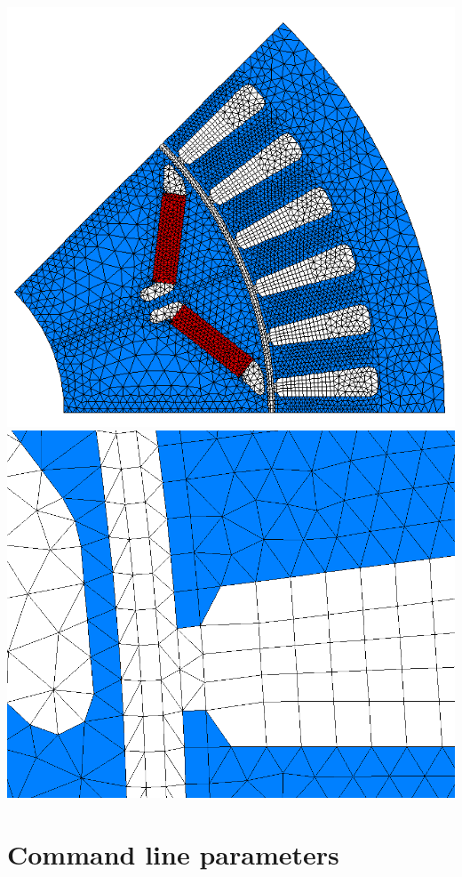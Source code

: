 \documentclass[10pt, a4paper,german]{scrartcl}
\begin{document}
\includegraphics[width=0.45\linewidth]{mesh}\hfill\includegraphics[width=0.45\linewidth]{airgap}
%
\section{Command line parameters}
\end{document}
